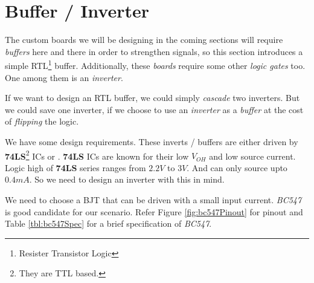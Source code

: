 \documentclass[../../main]{subfiles}
\begin{document}
\section{Buffer / Inverter} \label{sec:}

The custom boards we will be designing in the coming sections will require \emph{buffers}
here and there in order to strengthen signals, so this section introduces a simple
RTL\footnote{Resister Transistor Logic} buffer. Additionally, these \emph{boards} require
some other \emph{logic gates} too. One among them is an \emph{inverter}.

If we want to design an RTL buffer, we could simply \emph{cascade} two inverters. But we
could save one inverter, if we choose to use an \emph{inverter} as a \emph{buffer} at
the cost of \emph{flipping} the logic.


We have some design requirements. These inverts / buffers are either driven by
\textbf{74LS}\footnote{They are TTL based.} ICs or \esp. \textbf{74LS} ICs are known
for their low $\si{V}_{OH}$ and low source current. Logic high of \textbf{74LS} series ranges
from $2.2\si{V}$ to $3\si{V}$. And can only source upto $0.4\si{mA}$. So we need to
design an inverter with this in mind.

We need to choose a BJT that can be driven with a small input current. \emph{BC547} is
good candidate for our scenario. Refer Figure \ref{fig:bc547Pinout} for pinout and Table
\ref{tbl:bc547Spec} for a brief specification of \emph{BC547}.
\end{document}
